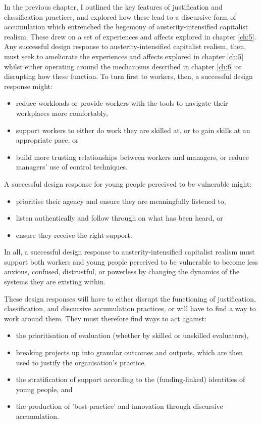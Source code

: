 In the previous chapter, I outlined the key features of justification and classification practices, and explored how these lead to a discursive form of accumulation which entrenched the hegemony of austerity-intensified capitalist realism. These drew on a set of experiences and affects explored in chapter \ref{ch:5}. Any successful design response to austerity-intensified capitalist realism, then, must seek to ameliorate the experiences and affects explored in chapter \ref{ch:5} whilst either operating around the mechanisms described in chapter \ref{ch:6} or disrupting how these function. To turn first to workers, then, a successful design response might:
\begin{itemize}
    \item reduce workloads or provide workers with the tools to navigate their workplaces more comfortably,
    \item support workers to either do work they are skilled at, or to gain skills at an appropriate pace, or
    \item build more trusting relationships between workers and managers, or reduce managers' use of control techniques.
\end{itemize}
A successful design response for young people perceived to be vulnerable might:
\begin{itemize}
    \item prioritise their agency and ensure they are meaningfully listened to,
    \item listen authentically and follow through on what has been heard, or
    \item ensure they receive the right support. 
\end{itemize}
In all, a successful design response to austerity-intensified capitalist realism must support both workers and young people perceived to be vulnerable to become less anxious, confused, distrustful, or powerless by changing the dynamics of the systems they are existing within. 

These design responses will have to either disrupt the functioning of justification, classification, and discursive accumulation practices, or will have to find a way to work around them. They must therefore find ways to act against:
\begin{itemize}
    \item the prioritisation of evaluation (whether by skilled or unskilled evaluators),
    \item breaking projects up into granular outcomes and outputs, which are then used to justify the organisation's practice,
    \item the stratification of support according to the (funding-linked) identities of young people, and
    \item the production of 'best practice' and innovation through discursive accumulation.
\end{itemize}

